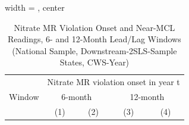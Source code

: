 
\begin{table}[htbp]
   
   \caption{\label{tab:mr_concentration_lag_national_downstream_states_yearly} Nitrate MR Violation Onset and Near-MCL Readings, 6- and 12-Month Lead/Lag Windows (National Sample, Downstream-2SLS-Sample States, CWS-Year)}
   \bigskip
   
   \centering
   
   \begin{adjustbox}{width = \textwidth, center}
      
      
      \begin{tabular}{lcccc}
         \toprule
         
          & \multicolumn{4}{c}{Nitrate MR violation onset in year t}\\
         
         Window & \multicolumn{2}{c}{6-month} & \multicolumn{2}{c}{12-month} \\ 
         
                                                      & (1)             & (2)             & (3)             & (4)\\  
         

\end{tabular}
\end{adjustbox}
\end{table}
